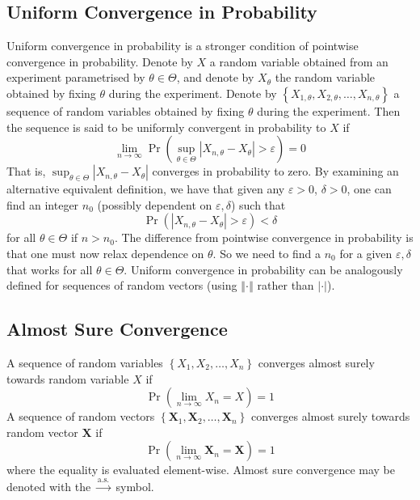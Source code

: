 \documentclass[11pt]{report} %
\begin{document}
\subsection{Uniform Convergence in Probability}

Uniform convergence in probability is a stronger condition of pointwise convergence in probability. Denote by $X$ a random variable obtained from an experiment parametrised by $\theta\in\Theta$, and denote by $X_{\theta}$ the random variable obtained by fixing $\theta$ during the experiment. Denote by $\left\{X_{1, \theta}, X_{2, \theta}, \dots, X_{n, \theta}\right\}$ a sequence of random variables obtained by fixing $\theta$ during the experiment. Then the sequence is said to be uniformly convergent in probability to $X$ if
\begin{equation}
\lim_{n\to \infty}\operatorname{Pr}\left(\sup_{\theta\in\Theta}\left|X_{n, \theta} - X_{\theta}\right| > \varepsilon\right) = 0
\end{equation}
That is, $\sup_{\theta\in\Theta}\left|X_{n, \theta} - X_{\theta}\right|$ converges in probability to zero. By examining an alternative equivalent definition, we have that given any $\varepsilon > 0$, $\delta > 0$, one can find an integer $n_{0}$ (possibly dependent on $\varepsilon, \delta$) such that 
\begin{equation}
\operatorname{Pr}\left(\left|X_{n, \theta} - X_{\theta}\right| > \varepsilon\right) < \delta
\end{equation}
for all $\theta\in\Theta$ if $n > n_{0}$. The difference from pointwise convergence in probability is that one must now relax dependence on $\theta$. So we need to find a $n_{0}$ for a given $\varepsilon, \delta$ that works for all $\theta\in\Theta$. Uniform convergence in probability can be analogously defined for sequences of random vectors (using $\left\Vert\cdot\right\Vert$ rather than $\left|\cdot\right|$).

\subsection{Almost Sure Convergence}

A sequence of random variables $\left\{X_{1}, X_{2}, \dots, X_{n} \right\}$ converges almost surely towards random variable $X$ if
\begin{equation}
\operatorname{Pr}\left(\lim_{n\to\infty}X_{n} = X\right) = 1
\end{equation}
A sequence of random vectors $\left\{\mathbf{X}_{1}, \mathbf{X}_{2}, \dots, \mathbf{X}_{n} \right\}$ converges almost surely towards random vector $\mathbf{X}$ if
\begin{equation}
\operatorname{Pr}\left(\lim_{n\to\infty}\mathbf{X}_{n} = \mathbf{X}\right) = 1
\end{equation}
where the equality is evaluated element-wise. Almost sure convergence may be denoted with the $\overset{\mathrm{a.s.}}\to$ symbol.\\
\end{document}
